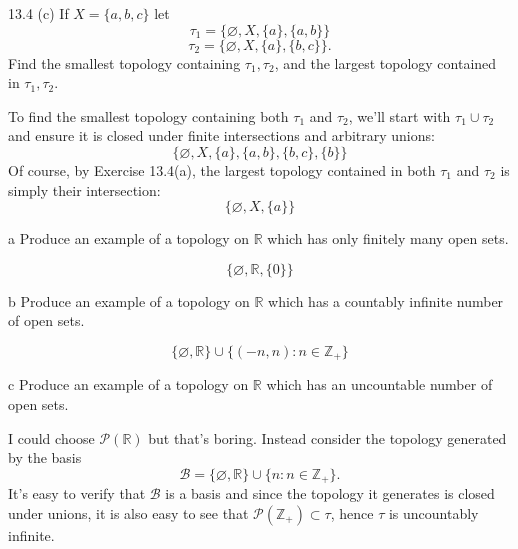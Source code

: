 \documentclass[11pt]{article}
\begin{document}
\begin{ex}{13.4 (c)}
  If $X = \{a, b, c\}$ let
  \[ \tau_1 = \{\varnothing, X, \{a\}, \{a, b\}\}\]
  \[\tau_2 = \{\varnothing, X, \{a\}, \{b, c\}\}.\]
  Find the smallest topology
  containing $\tau_1, \tau_2$, and the largest topology contained in $\tau_1,
  \tau_2$.
\end{ex}

\begin{solution}
  To find the smallest topology containing both $\tau_1$ and $\tau_2$, we'll
  start with $\tau_1 \cup \tau_2$ and ensure it is closed under finite
  intersections and arbitrary unions:
  \[ \{\varnothing, X, \{a\}, \{a,b\}, \{b,c\},\{b\} \} \]
  Of course, by Exercise 13.4(a), the largest topology contained in both
  $\tau_1$ and $\tau_2$ is simply their intersection:
  \[ \{\varnothing, X, \{a\} \} \]
\end{solution}


\begin{p}{a}
  Produce an example of a topology on $\mathbb{R}$ which has only finitely many
  open sets.
\end{p}

\begin{solution}
  \[ \{\varnothing, \mathbb{R}, \{0\} \} \]
\end{solution}

\begin{p}{b}
  Produce an example of a topology on $\mathbb{R}$ which has a countably
  infinite number of open sets.
\end{p}

\begin{solution}
  \[ \{\varnothing, \mathbb{R} \} \cup \{ (-n, n) : n \in \mathbb{Z}_+ \} \]
\end{solution}

\begin{p}{c}
  Produce an example of a topology on $\mathbb{R}$ which has an uncountable
  number of open sets.
\end{p}

\begin{solution}
  I could choose $\mathcal{P}(\mathbb{R})$ but that's boring. Instead consider
  the topology generated by the basis
  \[ \mathcal{B} = \{\varnothing, \mathbb{R}\} \cup \{n : n \in \mathbb{Z}_+\}. \]
  It's easy to verify that $\mathcal{B}$ is a basis and since the topology it
  generates is closed under unions, it is also easy to see that
  $\mathcal{P}(\mathbb{Z}_+) \subset \tau$, hence $\tau$ is uncountably
  infinite.
\end{solution}
\end{document}
